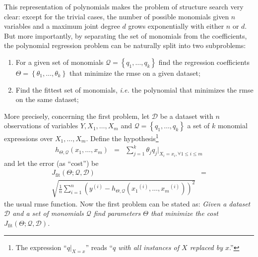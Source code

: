 \documentclass[preprint,authoryear,12pt]{elsarticle}
\newcommand{\sample}[1]{\ensuremath{^{\left(#1\right)}}}
\begin{document}
This representation of polynomials makes the problem of structure search very clear: except for the trivial cases, the number of possible monomials given $n$ variables and a maximum joint degree $d$ grows exponentially with either $n$ or $d$. But more importantly, by separating the set of monomials from the coefficients, the polynomial regression problem can be naturally split into two subproblems:
%
\begin{enumerate}
\item For a given set of monomials $\mathcal{Q} = \left\lbrace q_1, \ldots, q_k\right\rbrace$ find the regression coefficients $\Theta = \left\lbrace \theta_1,\ldots,\theta_k \right\rbrace$ that minimize the \ac{rmse} on a given dataset;

\item Find the fittest set of monomials, \emph{i.e.} the polynomial that minimizes the \ac{rmse} on the same dataset;
\end{enumerate}
%
More precisely, concerning the first problem, let $\mathcal{D}$ be a dataset with $n$ observations of variables $Y, X_1,\ldots,X_m$ and $\mathcal{Q} = \left\lbrace q_1,\ldots, q_k\right\rbrace$ a set of $k$ monomial expressions over $X_1,\ldots,X_m$. Define the hypothesis\footnote{The expression ``$q|_{X=x}$'' reads ``\emph{$q$ with all instances of $X$ replaced by $x$}.''}
%
\begin{eqnarray*}
h_{\Theta,\mathcal{Q}}\left(x_1,\ldots,x_m\right) &=& \sum_{j = 1}^k \theta_j q_j|_{X_i=x_i,\forall 1 \leq i \leq m}
\end{eqnarray*}
%
and let the error (as ``cost'') be
%
\begin{eqnarray}
J_{\textrm{fit}}\left(\Theta;\mathcal{Q},\mathcal{D}\right)  & =  \nonumber \\
\sqrt{\frac{1}{n}\sum_{i=1}^n \left( y\sample{i} - h_{\Theta,\mathcal{Q}}\left( x_1\sample{i},\ldots,x_m\sample{i} \right) \right)^2 }\label{eq:rmse}
\end{eqnarray}
%
the usual \acf{rmse} function. Now the first problem can be stated as:
%
\emph{Given a dataset $\mathcal{D}$ and a set of monomials $\mathcal{Q}$ find parameters $\Theta$ that minimize the cost $J_{\textrm{fit}}\left(\Theta;\mathcal{Q},\mathcal{D}\right)$.}
\end{document}
